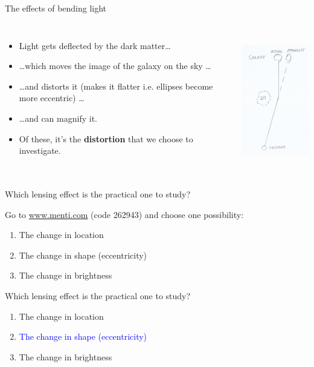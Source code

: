 \documentclass[usenames,dvipsnames]{beamer}
\newcommand{\mentiurl}[0]{{\url{www.menti.com}}}
\newcommand{\menticode}[0]{{262943}}
\newcommand{\mentiinvitation}[0]{Go to \mentiurl{} (code \menticode{}) and choose one possibility:\\}
\newcommand{\correctanswer}[1]{\textcolor{blue}{{#1} \checkmark}}
\begin{document}
\begin{frame}{The effects of bending light}
  \begin{columns}
    \begin{itemize}
      \item{Light gets deflected by the dark matter\ldots}
      \item{\ldots which moves the image of the galaxy on the sky \ldots}
	\item{\ldots and distorts it (makes it flatter i.e. ellipses become more eccentric) \ldots}
	\item{\ldots and can magnify it.}
	\item{Of these, it's the \textbf{distortion} that we choose to investigate.}
    \end{itemize}
    \centering
    \includegraphics[height=6cm]{diagram_1.png}
  \end{columns}
\end{frame}


\begin{frame}{Which lensing effect is the practical one to study?}
  \begin{block}{}
    \mentiinvitation{}
    \begin{enumerate}
      \item{The change in location}
      \item{The change in shape (eccentricity)}
      \item{The change in brightness}
    \end{enumerate}
  \end{block}
\end{frame}

\begin{frame}{Which lensing effect is the practical one to study?}
  \begin{block}{}
    \begin{enumerate}
      \item{The change in location}
      \item{\correctanswer{The change in shape (eccentricity)}}
      \item{The change in brightness}
    \end{enumerate}
  \end{block}
\end{frame}
\end{document}
